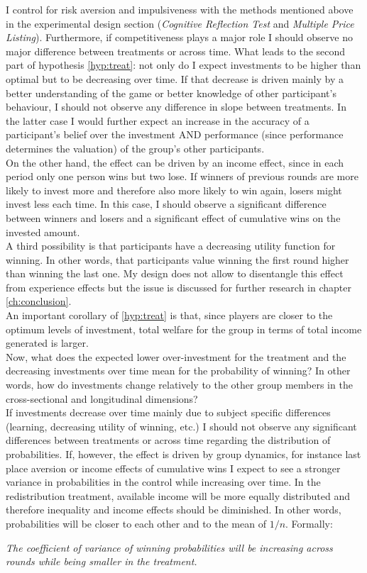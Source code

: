     I control for risk aversion and impulsiveness with the methods mentioned above in the experimental design section (\textit{Cognitive Reflection Test} and \textit{Multiple Price Listing}). Furthermore, if competitiveness plays a major role I should observe no major difference between treatments or across time. What leads to the second part of hypothesis \ref{hyp:treat}: not only do I expect investments to be higher than optimal but to be decreasing over time. If that decrease is driven mainly by a better understanding of the game or better knowledge of other participant's behaviour, I should not observe any difference in slope between treatments. In the latter case I would further expect an increase in the accuracy of a participant's belief over the investment AND performance (since performance determines the valuation) of the group's other participants.\\
    
    On the other hand, the effect can be driven by an income effect, since in each period only one person wins but two lose. If winners of previous rounds are more likely to invest more and therefore also more likely to win again, losers might invest less each time.  In this case, I should observe a significant difference between winners and losers and a significant effect of cumulative wins on the invested amount.\\
    
    A third possibility is that participants have a decreasing utility function for winning. In other words, that participants value winning the first round higher than winning the last one. My design does not allow to disentangle this effect from experience effects but the issue is discussed for further research in chapter \ref{ch:conclusion}.\\
      
    An important corollary of \cref{hyp:treat} is that, since players are closer to the optimum levels of investment, total welfare for the group in terms of total income generated is larger.\\
    
    Now, what does the expected lower over-investment for the treatment and the decreasing investments over time mean for the probability of winning? In other words, how do investments change relatively to the other group members in the cross-sectional and longitudinal dimensions?\\
    
    If investments decrease over time mainly due to subject specific differences (learning, decreasing utility of winning, etc.) I should not observe any significant differences between treatments or across time regarding the distribution of probabilities. If, however, the effect is driven by group dynamics, for instance last place aversion or income effects of cumulative wins I expect to see a stronger variance in probabilities in the control while increasing over time. In the redistribution treatment, available income will be more equally distributed and therefore inequality and income effects should be diminished. In other words, probabilities will be closer to each other and to the mean of $1/n$. Formally:
    
    \begin{hyp}\label{hyp:wins}
    \textit{The coefficient of variance of winning probabilities will be increasing across rounds while being smaller in the treatment.}
    \end{hyp}
    
 